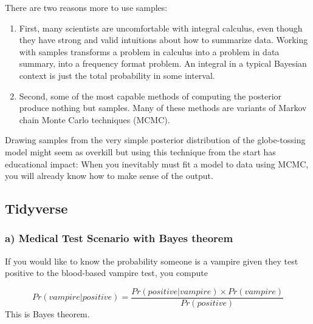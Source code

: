 \documentclass[
  letterpaper,
  DIV=11,
  numbers=noendperiod]{scrreprt}
\providecommand{\tightlist}{%
  \setlength{\itemsep}{0pt}\setlength{\parskip}{0pt}}\usepackage{longtable,booktabs,array}
\begin{document}
There are two reasons more to use samples:

\begin{enumerate}
\def\labelenumi{\arabic{enumi}.}
\tightlist
\item
  First, many scientists are uncomfortable with integral calculus, even
  though they have strong and valid intuitions about how to summarize
  data. Working with samples transforms a problem in calculus into a
  problem in data summary, into a frequency format problem. An integral
  in a typical Bayesian context is just the total probability in some
  interval.
\item
  Second, some of the most capable methods of computing the posterior
  produce nothing but samples. Many of these methods are variants of
  Markov chain Monte Carlo techniques (MCMC).
\end{enumerate}

Drawing samples from the very simple posterior distribution of the
globe-tossing model might seem as overkill but using this technique from
the start has educational impact: When you inevitably must fit a model
to data using MCMC, you will already know how to make sense of the
output.

\hypertarget{tidyverse-9}{%
\subsection*{Tidyverse}\label{tidyverse-9}}

\hypertarget{a-medical-test-scenario-with-bayes-theorem-1}{%
\subsubsection*{a) Medical Test Scenario with Bayes
theorem}\label{a-medical-test-scenario-with-bayes-theorem-1}}

If you would like to know the probability someone is a vampire given
they test positive to the blood-based vampire test, you compute

\[
Pr(vampire|positive) = \frac{Pr(positive|vampire) \times Pr(vampire)} {Pr(positive)}
\] This is Bayes theorem.
\end{document}
